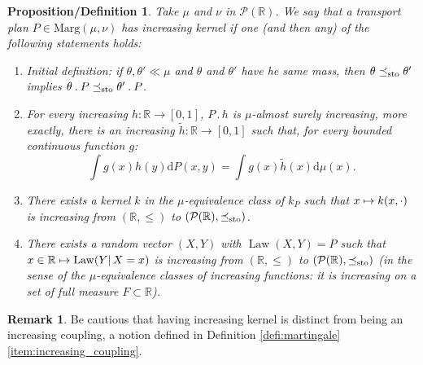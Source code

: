\documentclass[JEP,XML,SOM,Unicode,NoEqCountersInSection,NoFloatCountersInSection,published]{cedram}
\newcommand{\ldot}{\mathbin{.}}
\newcommand\mto{\mathchoice{\longmapsto}{\mapsto}{\mapsto}{\mapsto}}
\theoremstyle{plain}
\newtheorem{prodefinition}[them]{Proposition/Definition}
\theoremstyle{definition}
\newtheorem{rem}[them]{Remark}
\newcommand{\dd}{\mathrm{d}}
\newcommand{\p}{\mathcal{P}}
\newcommand{\ma}{\mathrm{Marg}}
\newcommand{\R}{\mathbb{R}}
\newcommand{\law}{\operatorname{Law}}
\newcommand{\leqs}{\preceq_{\text{\rm sto}}}
\begin{document}
\begin{prodefinition}\label{prodef:transitions}
Take $\mu$ and $\nu$ in $\p(\R)$. We say that a transport plan $P\in\ma(\mu,\nu)$ has \emph{increasing kernel} if one (and then any) of the following statements holds:
\begin{enumerate}
\item\label{prodef:transitionsa}
\label{item:transitions_croissantes_application_croissante} Initial definition: if $\theta,\theta'\ll \mu$ and $\theta$ and $\theta'$ have he same mass, then $\theta\leqs \theta'$ implies $\theta \ldot P\leqs \theta'\ldot P$.

\item\label{prodef:transitionsb}
\label{pt:condexp} For every increasing $h:\R\to[0,1]$, $P\ldot h$ is $\mu$-almost surely increasing, \ie more exactly, there is an increasing $\tilde{h}:\R\to [0,1]$ such that, for every bounded continuous function $g$:
\[\int g(x)h(y) \dd P(x,y)= \int g(x)\tilde{h}(x)\dd \mu(x).\]

\item\label{prodef:transitionsc}
There exists a kernel $k$ in the $\mu$-equivalence class of $k_P$ such that $x\mto k(x,\cdot)$ is increasing from $(\R,\leq)$ to $(\p(\R),\leqs)$.

\item\label{prodef:transitionsd}
There exists a random vector $(X,Y)$ with $\law(X,Y)=P$ such that $x\in\R\mto\law(Y|\,X=x)$ is increasing from $(\R,\leq)$ to $(\p(\R),\leqs)$ (in the sense of the $\mu$\nobreakdash-equi\-valence classes of {\small increasing} functions: it is increasing on a set of full measure $F\subset \R$).
\end{enumerate}
\end{prodefinition}

\begin{rem}Be cautious that having increasing kernel is distinct from being an increasing coupling, a notion defined in Definition \ref{defi:martingale}\eqref{item:increasing_coupling}.
\end{rem}
\end{document}

